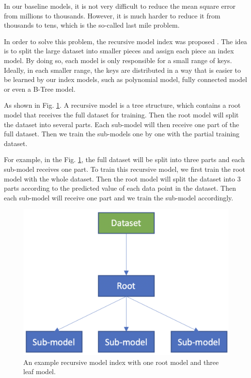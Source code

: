 \label{sssec:RMI}
In our baseline models, it is not very difficult to reduce the mean square error from millions to thousands. However, it is much harder to reduce it from thousands to tens, which is the so-called last mile problem.

In order to solve this problem, the recursive model index was proposed \cite{kraska2018case}. The idea is to split the large dataset into smaller pieces and assign each piece an index model. By doing so, each model is only responsible for a small range of keys. Ideally, in each smaller range, the keys are distributed in a way that is easier to be learned by our index models, such as polynomial model, fully connected model or even a B-Tree model.

As shown in Fig. \ref{rmi_structure}. A recursive model is a tree structure, which contains a root model that receives the full dataset for training. Then the root model will split the dataset into several parts. Each sub-model will then receive one part of the full dataset. Then we train the sub-models one by one with the partial training dataset. 

\begin{mscexample}
	For example, in the Fig. \ref{rmi_structure}, the full dataset will be split into three parts and each sub-model receives one part. To train this recursive model, we first train the root model with the whole dataset. Then the root model will split the dataset into 3 parts according to the predicted value of each data point in the dataset. Then each sub-model will receive one part and we train the sub-model accordingly.
\end{mscexample}

\begin{figure}[h]
\centering
\includegraphics[scale=0.4]{graphs/implementation/one-dim/rmi_demo.pdf}
\caption{An example recursive model index with one root model and three leaf model.}
\label{rmi_structure}
\end{figure}

